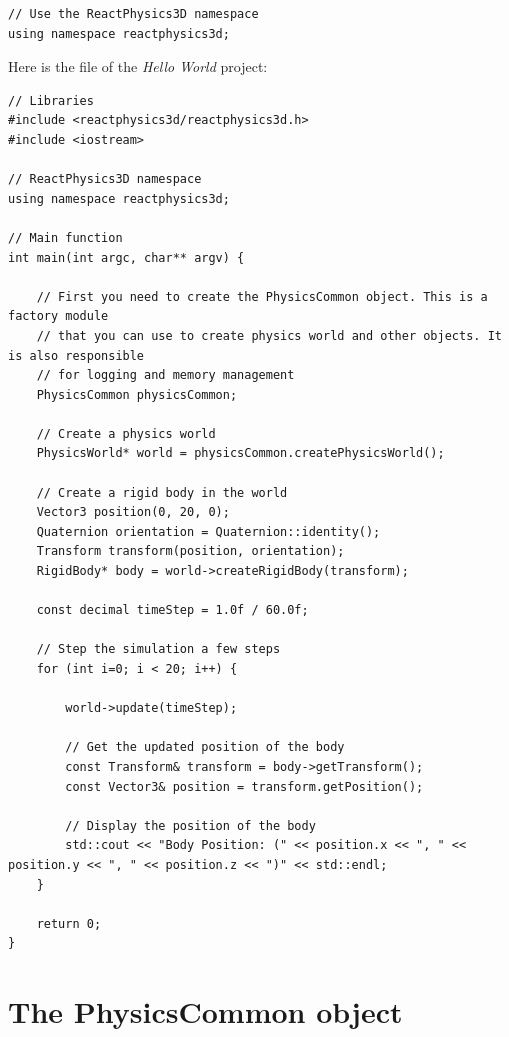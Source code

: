 \documentclass[a4paper,12pt]{article}
\begin{document}
    \begin{lstlisting}
// Use the ReactPhysics3D namespace
using namespace reactphysics3d;
    \end{lstlisting}

    \vspace{0.6cm}

    Here is the  file of the \emph{Hello World} project: \\

    \begin{lstlisting}
// Libraries
#include <reactphysics3d/reactphysics3d.h>
#include <iostream>

// ReactPhysics3D namespace
using namespace reactphysics3d;

// Main function
int main(int argc, char** argv) {

    // First you need to create the PhysicsCommon object. This is a factory module
    // that you can use to create physics world and other objects. It is also responsible
    // for logging and memory management
    PhysicsCommon physicsCommon;

    // Create a physics world
    PhysicsWorld* world = physicsCommon.createPhysicsWorld();

    // Create a rigid body in the world
    Vector3 position(0, 20, 0);
    Quaternion orientation = Quaternion::identity();
    Transform transform(position, orientation);
    RigidBody* body = world->createRigidBody(transform);

    const decimal timeStep = 1.0f / 60.0f;

    // Step the simulation a few steps
    for (int i=0; i < 20; i++) {

        world->update(timeStep);

        // Get the updated position of the body
        const Transform& transform = body->getTransform();
        const Vector3& position = transform.getPosition();

        // Display the position of the body
        std::cout << "Body Position: (" << position.x << ", " << position.y << ", " << position.z << ")" << std::endl;
    }

    return 0;
}
    \end{lstlisting}
   
   \section{The PhysicsCommon object}
     \label{sec:physicscommon}
\end{document}
